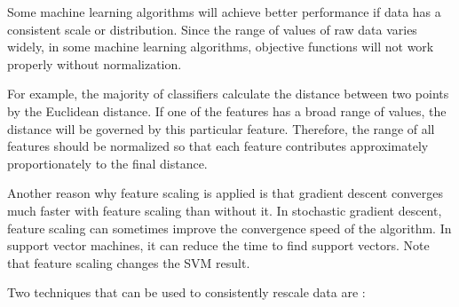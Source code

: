 \documentclass[11pt]{article}
\begin{document}
    Some machine learning algorithms will achieve better performance if data has a consistent scale or distribution.
    Since the range of values of raw data varies widely, in some machine learning algorithms, objective functions will not work properly without normalization.

    For example, the majority of classifiers calculate the distance between two points by the Euclidean distance.
    If one of the features has a broad range of values, the distance will be governed by this particular feature.
    Therefore, the range of all features should be normalized so that each feature contributes approximately proportionately to the final distance.

    Another reason why feature scaling is applied is that gradient descent converges much faster with feature scaling than without it.
    In stochastic gradient descent, feature scaling can sometimes improve the convergence speed of the algorithm.
    In support vector machines, it can reduce the time to find support vectors.
    Note that feature scaling changes the SVM result.

    Two techniques that can be used to consistently rescale data are :
\end{document}
